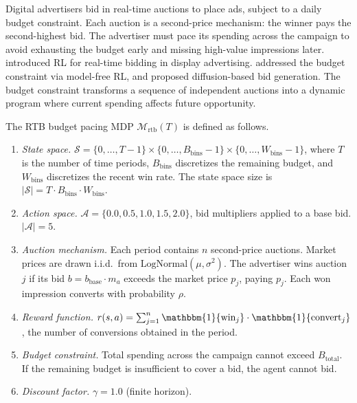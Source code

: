 Digital advertisers bid in real-time auctions to place ads, subject to a daily budget constraint. Each auction is a second-price mechanism: the winner pays the second-highest bid. The advertiser must pace its spending across the campaign to avoid exhausting the budget early and missing high-value impressions later. \citet{Cai2017rtb} introduced RL for real-time bidding in display advertising. \citet{Wu2018budgetbidding} addressed the budget constraint via model-free RL, and \citet{Guo2024diffbid} proposed diffusion-based bid generation. The budget constraint transforms a sequence of independent auctions into a dynamic program where current spending affects future opportunity.

\begin{definition}
\label{def:rtb_mdp}
The RTB budget pacing MDP $\mathcal{M}_{\mathrm{rtb}}(T)$ is defined as follows.
\begin{enumerate}
    \item \emph{State space.} $\mathcal{S} = \{0, \ldots, T-1\} \times \{0, \ldots, B_{\mathrm{bins}}-1\} \times \{0, \ldots, W_{\mathrm{bins}}-1\}$, where $T$ is the number of time periods, $B_{\mathrm{bins}}$ discretizes the remaining budget, and $W_{\mathrm{bins}}$ discretizes the recent win rate. The state space size is $|\mathcal{S}| = T \cdot B_{\mathrm{bins}} \cdot W_{\mathrm{bins}}$.
    \item \emph{Action space.} $\mathcal{A} = \{0.0, 0.5, 1.0, 1.5, 2.0\}$, bid multipliers applied to a base bid. $|\mathcal{A}| = 5$.
    \item \emph{Auction mechanism.} Each period contains $n$ second-price auctions. Market prices are drawn i.i.d.\ from $\mathrm{LogNormal}(\mu, \sigma^2)$. The advertiser wins auction $j$ if its bid $b = b_{\mathrm{base}} \cdot m_a$ exceeds the market price $p_j$, paying $p_j$. Each won impression converts with probability $\rho$.
    \item \emph{Reward function.} $r(s, a) = \sum_{j=1}^{n} \mathbbm{1}\{\text{win}_j\} \cdot \mathbbm{1}\{\text{convert}_j\}$, the number of conversions obtained in the period.
    \item \emph{Budget constraint.} Total spending across the campaign cannot exceed $B_{\mathrm{total}}$. If the remaining budget is insufficient to cover a bid, the agent cannot bid.
    \item \emph{Discount factor.} $\gamma = 1.0$ (finite horizon).
\end{enumerate}
\end{definition}

